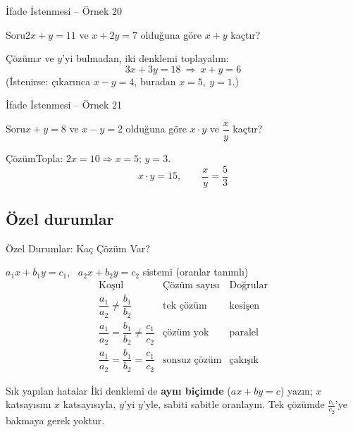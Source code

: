 \documentclass[aspectratio=169,11pt]{beamer}
\newcommand{\soru}[3]{%
\begin{frame}{#1}
  \begin{block}{Soru}\large #2\end{block}
  \pause
  \begin{exampleblock}{Çözüm}\large #3\end{exampleblock}
\end{frame}}
\begin{document}
\soru{İfade İstenmesi -- Örnek 20}
{\(2x+y=11\) ve \(x+2y=7\) olduğuna göre \(x+y\) kaçtır?}
{\(x\) ve \(y\)'yi bulmadan, iki denklemi toplayalım:
\[3x+3y=18\ \Rightarrow\ x+y=6\]
(İstenirse: çıkarınca \(x-y=4\), buradan \(x=5,\ y=1\).)}

\soru{İfade İstenmesi -- Örnek 21}
{\(x+y=8\) ve \(x-y=2\) olduğuna göre \(x\cdot y\) ve \(\dfrac{x}{y}\) kaçtır?}
{Topla: \(2x=10\Rightarrow x=5\); \quad \(y=3\).
\[x\cdot y=15,\qquad \frac{x}{y}=\frac{5}{3}\]}

\subsection{Özel durumlar}
\begin{frame}{Özel Durumlar: Kaç Çözüm Var?}
\begin{block}{\(a_1x+b_1y=c_1\), \ \(a_2x+b_2y=c_2\) sistemi \quad (oranlar tanımlı)}
\[\renewcommand{\arraystretch}{1.2}
\begin{array}{lll}
\text{Koşul} & \text{Çözüm sayısı} & \text{Doğrular}\\\hline
\dfrac{a_1}{a_2}\neq\dfrac{b_1}{b_2} & \text{tek çözüm} & \text{kesişen}\\[10pt]
\dfrac{a_1}{a_2}=\dfrac{b_1}{b_2}\neq\dfrac{c_1}{c_2} & \text{çözüm yok} & \text{paralel}\\[10pt]
\dfrac{a_1}{a_2}=\dfrac{b_1}{b_2}=\dfrac{c_1}{c_2} & \text{sonsuz çözüm} & \text{çakışık}
\end{array}\]
\end{block}
\begin{alertblock}{Sık yapılan hatalar}
İki denklemi de \textbf{aynı biçimde} (\(ax+by=c\)) yazın; \(x\) katsayısını \(x\) katsayısıyla, \(y\)'yi \(y\)'yle, sabiti sabitle oranlayın. Tek çözümde \(\frac{c_1}{c_2}\)'ye bakmaya gerek yoktur.
\end{alertblock}
\end{frame}
\end{document}
